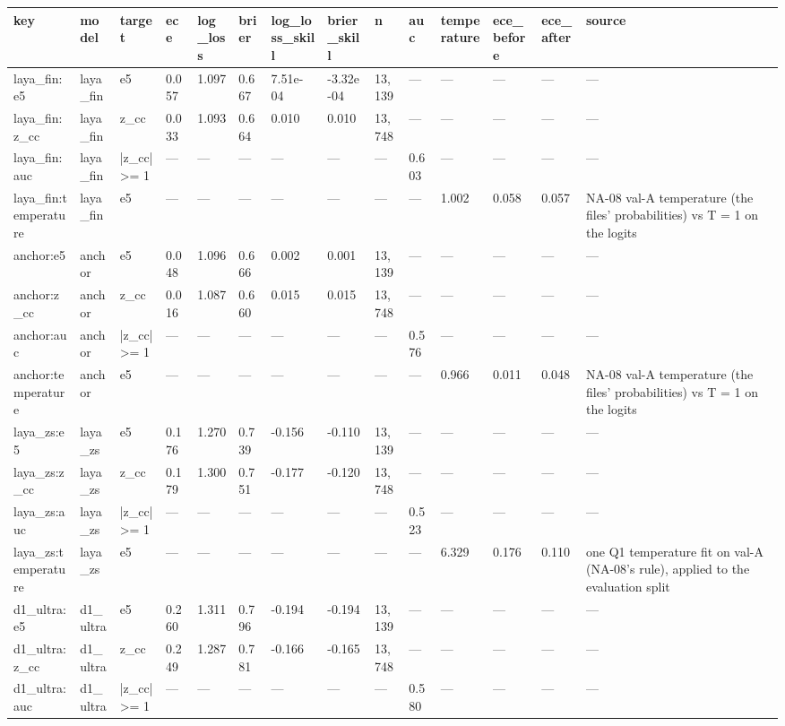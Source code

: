 \begin{tabular}{llllllllllllll}
\toprule
key & model & target & ece & log\_loss & brier & log\_loss\_skill & brier\_skill & n & auc & temperature & ece\_before & ece\_after & source \\
\midrule
laya\_fin:e5 & laya\_fin & e5 & 0.057 & 1.097 & 0.667 & 7.51e-04 & -3.32e-04 & 13,139 & — & — & — & — & — \\
laya\_fin:z\_cc & laya\_fin & z\_cc & 0.033 & 1.093 & 0.664 & 0.010 & 0.010 & 13,748 & — & — & — & — & — \\
laya\_fin:auc & laya\_fin & |z\_cc| >= 1 & — & — & — & — & — & — & 0.603 & — & — & — & — \\
laya\_fin:temperature & laya\_fin & e5 & — & — & — & — & — & — & — & 1.002 & 0.058 & 0.057 & NA-08 val-A temperature (the files' probabilities) vs T = 1 on the logits \\
anchor:e5 & anchor & e5 & 0.048 & 1.096 & 0.666 & 0.002 & 0.001 & 13,139 & — & — & — & — & — \\
anchor:z\_cc & anchor & z\_cc & 0.016 & 1.087 & 0.660 & 0.015 & 0.015 & 13,748 & — & — & — & — & — \\
anchor:auc & anchor & |z\_cc| >= 1 & — & — & — & — & — & — & 0.576 & — & — & — & — \\
anchor:temperature & anchor & e5 & — & — & — & — & — & — & — & 0.966 & 0.011 & 0.048 & NA-08 val-A temperature (the files' probabilities) vs T = 1 on the logits \\
laya\_zs:e5 & laya\_zs & e5 & 0.176 & 1.270 & 0.739 & -0.156 & -0.110 & 13,139 & — & — & — & — & — \\
laya\_zs:z\_cc & laya\_zs & z\_cc & 0.179 & 1.300 & 0.751 & -0.177 & -0.120 & 13,748 & — & — & — & — & — \\
laya\_zs:auc & laya\_zs & |z\_cc| >= 1 & — & — & — & — & — & — & 0.523 & — & — & — & — \\
laya\_zs:temperature & laya\_zs & e5 & — & — & — & — & — & — & — & 6.329 & 0.176 & 0.110 & one Q1 temperature fit on val-A (NA-08's rule), applied to the evaluation split \\
d1\_ultra:e5 & d1\_ultra & e5 & 0.260 & 1.311 & 0.796 & -0.194 & -0.194 & 13,139 & — & — & — & — & — \\
d1\_ultra:z\_cc & d1\_ultra & z\_cc & 0.249 & 1.287 & 0.781 & -0.166 & -0.165 & 13,748 & — & — & — & — & — \\
d1\_ultra:auc & d1\_ultra & |z\_cc| >= 1 & — & — & — & — & — & — & 0.580 & — & — & — & — \\

\end{tabular}
